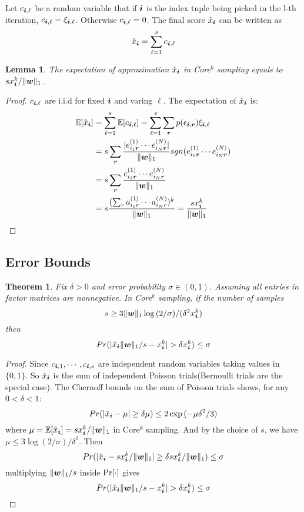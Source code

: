 \documentclass[letterpaper]{article}
\newcommand{\Sca}[3]{{#1}^{(#2)}_{i_#2#3}}%
\newcommand{\anr}[2]{\Sca{a}{#1}{#2}}
\newcommand{\enr}[2]{\Sca{e}{#1}{\V{#2}}}
\newcommand{\score}[1]{\xi_{\V{i},#1}}
\newcommand{\V}[1]{{\boldsymbol{{\MakeLowercase{#1}}}}}
\newcommand{\predx}{\hat{x}_{\V{i}}}
\newcommand{\norm}[2]{\|#1\|_{#2}}
\newtheorem{lemma}{Lemma}
\newtheorem{theorem}{Theorem}
\begin{document}
Let $c_{\V{i},\ell}$ be a random variable that if $\V{i}$ is the index tuple 
being picked in the l-th iteration, $c_{\V{i},\ell}=\score{\ell}$. 
Otherwise $c_{\V{i},\ell}=0$. 
The final score $\predx$ can be written as
\begin{equation}\label{eq:score}
\predx = \sum_{\ell=1}^{s} c_{\V{i},\ell}
\end{equation}
\begin{lemma}\label{lem:Expectation}
The expectation of approximation $\hat{x}_{\V{i}}$ in Core$^k$ sampling equals to $sx^k_{\V{i}}/\norm{\V{w}}{1}$.
\end{lemma}
\begin{proof}
    $c_{\V{i},\ell}$ are i.i.d for fixed $\V{i}$ and varing $\ell$. 
    The expectation of $\predx$ is:
\begin{align*}
\mathbb{E}[\predx]
& = \sum_{\ell=1}^{s}\mathbb{E}[c_{\V{i},\ell}] = \sum_{\ell=1}^{s}\sum_{\V{r}} p(\epsilon_{\V{i},\V{r}})\score{\ell} \\
& = s\sum_{\V{r}} \frac{|\enr{1}{r}\cdots\enr{N}{r}|}{\norm{\V{W}}{1}}
                  sgn(\enr{1}{r}\cdots\enr{N}{r})\\
& = s\sum_{\V{r}} \frac{\enr{1}{r}\cdots\enr{N}{r}}{\norm{\V{W}}{1}}\\
& = s\frac{(\sum_{r}\anr{1}{r}\cdots\anr{N}{r})^k}{\norm{\V{W}}{1}}
= \frac{sx^k_{\V{i}}}{\norm{\V{w}}{1}}
\end{align*}
\end{proof}

\subsection{Error Bounds}
\begin{theorem}\label{theo:Bound}
Fix $\delta > 0$ and error probability $\sigma \in (0,1)$.
Assuming all entries in factor matrices are nonnegative.
In Core$^k$ sampling, if the number of samples
\[
    s \geq 3\norm{\V{w}}{1}\log{(2/\sigma)}/(\delta^2 x^k_{\V{i}})
\]
then
\[
    Pr(|\predx\norm{\V{W}}{1}/s - x^k_{\V{i}}| > \delta x^k_{\V{i}}) \leq \sigma
\]
\end{theorem}

\begin{proof}
Since  $c_{\V{i},1},\cdots,c_{\V{i},s}$
are independent random variables taking values in $\{0,1\}$.
So $\predx$ is the sum of independent Poisson trials(Bernoulli trials are the special case).
The Chernoff bounds on the sum of Poisson trials shows, for any $0 <\delta <1 $:
\[
    Pr(|\predx - \mu|\geq\delta\mu) \leq 2\exp{(-\mu\delta^2/3)}
\]
where $\mu=\mathbb{E}[\predx]=sx^k_{\V{i}}/\norm{\V{W}}{1}$ in Core$^k$ sampling.
And by the choice of $s$, we have
$\mu\leq 3\log{(2/\sigma)/\delta^2}$.
Then
\[
    Pr(|\predx-sx^k_{\V{i}}/\norm{\V{W}}{1}|\geq\delta sx^k_{\V{i}}/\norm{\V{W}}{1}) \leq \sigma
\]
multiplying $\norm{\V{W}}{1}/s$ inside ${\rm Pr}[\cdot]$ gives
\[
    Pr(|\predx\norm{\V{W}}{1}/s - x^k_{\V{i}}| > \delta x^k_{\V{i}}) \leq \sigma
\]
\end{proof}
\end{document}
